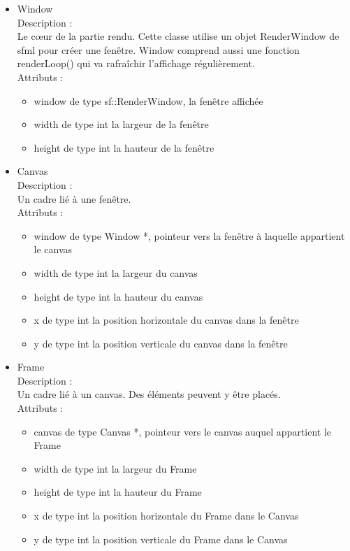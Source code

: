 \documentclass[a4paper,12pt]{article}
\begin{document}
\begin{itemize}
\item Window\\
Description :\\
Le c{\oe}ur de la partie rendu. Cette classe utilise un objet RenderWindow de sfml pour créer une fenêtre. Window comprend aussi une fonction renderLoop() qui va rafraîchir l'affichage régulièrement.\\
Attributs :
\begin{itemize}
\item window de type sf::RenderWindow, la fenêtre affichée
\item width de type int la largeur de la fenêtre
\item height de type int la hauteur de la fenêtre\\
\end{itemize}
\item Canvas\\
Description :\\
Un cadre lié à une fenêtre.\\
Attributs :
\begin{itemize}
\item window de type Window  *, pointeur vers la fenêtre à laquelle appartient le canvas
\item width de type int la largeur du canvas
\item height de type int la hauteur du canvas
\item x de type int la position horizontale du canvas dans la fenêtre
\item y de type int la position verticale du canvas dans la fenêtre\\
\end{itemize}
\item Frame\\
Description :\\
Un cadre lié à un canvas. Des éléments peuvent y être placés.\\
Attributs :
\begin{itemize}
\item canvas de type Canvas *, pointeur vers le canvas auquel appartient le Frame
\item width de type int la largeur du Frame
\item height de type int la hauteur du Frame
\item x de type int la position horizontale du Frame dans le Canvas
\item y de type int la position verticale du Frame dans le Canvas\\

\end{itemize}
\end{itemize}
\end{document}
